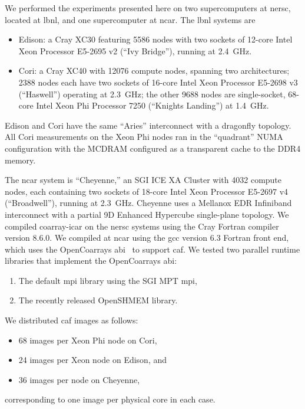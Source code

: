 We performed the experiments presented here on two supercomputers at \gls{nersc},
located at \gls{lbnl}, and one supercomputer at \gls{ncar}. The \gls{lbnl} systems are
\begin{itemize}

\item Edison: a Cray XC30 featuring 5586 nodes with two sockets of 12-core Intel Xeon Processor E5-2695 v2 (``Ivy Bridge''), running at \num{2.4}~\si{\giga\hertz}.
\item Cori: a Cray XC40 with \num{12076} compute nodes, spanning two architectures; \num{2388} nodes each have two sockets of 16-core Intel Xeon Processor E5-2698 v3 (``Haswell'') operating at \num{2.3}~\si{\giga\hertz}; the other \num{9688} nodes are single-socket, 68-core Intel Xeon Phi Processor 7250 (``Knights Landing'') at \num{1.4}~\si{\giga\hertz}.
\end{itemize}
Edison and Cori have the same ``Aries'' interconnect with a dragonfly topology.
All Cori measurements on the Xeon Phi nodes ran in the ``quadrant'' NUMA configuration with the MCDRAM configured as a transparent cache to the DDR4 memory.

The \gls{ncar} system is ``Cheyenne,'' an SGI ICE XA Cluster with \num{4032} compute nodes, each containing two sockets of 18-core Intel Xeon Processor E5-2697 v4 (``Broadwell''), running at \num{2.3}~\si{\giga\hertz}.
Cheyenne uses a Mellanox EDR Infiniband interconnect with a partial 9D Enhanced Hypercube single-plane topology.
We compiled coarray-\gls{icar} on the \gls{nersc} systems using the Cray Fortran compiler version 8.6.0.  We compiled
at \gls{ncar} using the \gls{gcc} version 6.3 Fortran front end, which uses the
OpenCoarrays \gls{abi}~\cite{fanfarillo2014opencoarrays} to support \gls{caf}.  We tested two parallel runtime libraries that implement the OpenCoarrays \gls{abi}:
\begin{enumerate}
  \item The default \gls{mpi} library using the SGI MPT \gls{mpi},
  \item The recently released OpenSHMEM library.
\end{enumerate}
We distributed \gls{caf} images as follows:
\begin{itemize}
  \item 68 images per Xeon Phi node on Cori,
  \item 24 images per Xeon node on Edison, and
  \item 36 images per node on Cheyenne,
\end{itemize}
corresponding to one image per physical core in each case.

